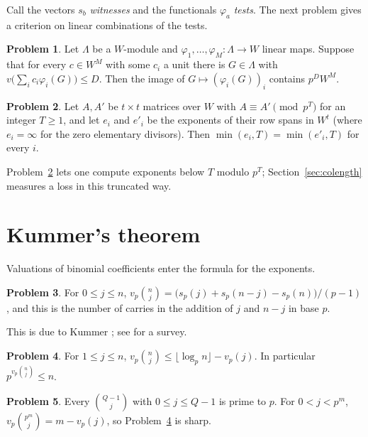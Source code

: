 \documentclass[reqno]{amsart}
\theoremstyle{definition}
\newtheorem{problem}{Problem}[section]
\theoremstyle{plain}
\begin{document}
Call the vectors \(s_b\) \emph{witnesses} and the functionals \(\varphi_a\) \emph{tests}.  The next problem gives a criterion on linear combinations of the tests.

\begin{problem}\label{pr:detect}
Let \(\Lambda\) be a \(W\)-module and \(\varphi_1, \dots, \varphi_M \colon \Lambda \to W\) linear maps.  Suppose that for every \(c \in W^M\) with some \(c_i\) a unit there is \(G \in \Lambda\) with \(v\bigl(\sum_i c_i \varphi_i(G)\bigr) \le D\).  Then the image of \(G \mapsto (\varphi_i(G))_i\) contains \(p^D W^M\).
\end{problem}

\begin{problem}\label{pr:trunc}
Let \(A, A'\) be \(t \times t\) matrices over \(W\) with \(A \equiv A' \pmod{p^T}\) for an integer \(T \ge 1\), and let \(e_i\) and \(e'_i\) be the exponents of their row spans in \(W^t\) (where \(e_i = \infty\) for the zero elementary divisors).  Then \(\min(e_i, T) = \min(e'_i, T)\) for every \(i\).
\end{problem}

Problem~\ref{pr:trunc} lets one compute exponents below \(T\) modulo \(p^T\); Section~\ref{sec:colength} measures a loss in this truncated way.

\section{Kummer's theorem}\label{sec:kummer}

Valuations of binomial coefficients enter the formula for the exponents.

\begin{problem}\label{pr:kummer}
For \(0 \le j \le n\), \(v_p\binom{n}{j} = \bigl(s_p(j) + s_p(n-j) - s_p(n)\bigr)/(p-1)\), and this is the number of carries in the addition of \(j\) and \(n - j\) in base \(p\).
\end{problem}

This is due to Kummer \cite{Ku}; see \cite{Gra} for a survey.

\begin{problem}\label{pr:kummer-bound}
For \(1 \le j \le n\), \(v_p\binom{n}{j} \le \lfloor \log_p n \rfloor - v_p(j)\).  In particular \(p^{v_p\binom nj} \le n\).
\end{problem}

\begin{problem}\label{pr:kummer-cases}
Every \(\binom{Q-1}{j}\) with \(0 \le j \le Q-1\) is prime to \(p\).  For \(0 < j < p^m\), \(v_p\binom{p^m}{j} = m - v_p(j)\), so Problem~\ref{pr:kummer-bound} is sharp.
\end{problem}
\end{document}
